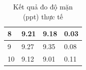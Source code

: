 \documentclass{article} %
\begin{document}
\begin{itemize}
\begin{itemize}[label=$\ast$]
\begin{table}[H]
\begin{tabular}{|l|l|l|l|}
					8               & 9.21                                                               & 9.18                                                                              & 0.03            \\ \hline
					9               & 9.27                                                               & 9.35                                                                              & 0.08            \\ \hline
					10              & 9.12                                                               & 9.01                                                                              & 0.11            \\ \hline
				\end{tabular}
				\caption{Kết quả đo độ mặn (ppt) thực tế}
				\label{bang6}
			\end{table}
			

\end{itemize}
\end{itemize}
\end{document}
